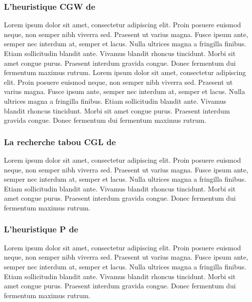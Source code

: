 \medskip

\subsubsection{L'heuristique CGW de \parencite{chao_new_1995}}
Lorem ipsum dolor sit amet, consectetur adipiscing elit. Proin posuere euismod neque, non semper nibh viverra sed. Praesent ut varius magna. Fusce ipsum ante, semper nec interdum at, semper et lacus. Nulla ultrices magna a fringilla finibus. Etiam sollicitudin blandit ante. Vivamus blandit rhoncus tincidunt. Morbi sit amet congue purus. Praesent interdum gravida congue. Donec fermentum dui fermentum maximus rutrum. Lorem ipsum dolor sit amet, consectetur adipiscing elit. Proin posuere euismod neque, non semper nibh viverra sed. Praesent ut varius magna. Fusce ipsum ante, semper nec interdum at, semper et lacus. Nulla ultrices magna a fringilla finibus. Etiam sollicitudin blandit ante. Vivamus blandit rhoncus tincidunt. Morbi sit amet congue purus. Praesent interdum gravida congue. Donec fermentum dui fermentum maximus rutrum.

\subsubsection{La recherche tabou CGL de \parencite{cordeau_tabu_1997} }
Lorem ipsum dolor sit amet, consectetur adipiscing elit. Proin posuere euismod neque, non semper nibh viverra sed. Praesent ut varius magna. Fusce ipsum ante, semper nec interdum at, semper et lacus. Nulla ultrices magna a fringilla finibus. Etiam sollicitudin blandit ante. Vivamus blandit rhoncus tincidunt. Morbi sit amet congue purus. Praesent interdum gravida congue. Donec fermentum dui fermentum maximus rutrum.

\medskip

\subsubsection{L'heuristique P de \parencite{paletta_period_2002}}
Lorem ipsum dolor sit amet, consectetur adipiscing elit. Proin posuere euismod neque, non semper nibh viverra sed. Praesent ut varius magna. Fusce ipsum ante, semper nec interdum at, semper et lacus. Nulla ultrices magna a fringilla finibus. Etiam sollicitudin blandit ante. Vivamus blandit rhoncus tincidunt. Morbi sit amet congue purus. Praesent interdum gravida congue. Donec fermentum dui fermentum maximus rutrum.

\medskip

